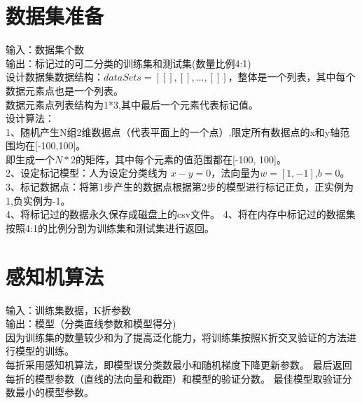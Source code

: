 \documentclass[UTF8,twoside,fontset=none,heading=true,scheme=chinese]{ctexart}
\begin{document}
    \section{数据集准备}
    \noindent 输入：数据集个数  \\
    输出：标记过的可二分类的训练集和测试集(数量比例4:1) \\
    设计数据集数据结构：$dataSets=[ [],[],...,[] ]$，整体是一个列表，其中每个数据元素点也是一个列表。 \\
    数据元素点列表结构为1*3,其中最后一个元素代表标记值。    \\
    设计算法：  \\
    1、随机产生N组2维数据点（代表平面上的一个点）,限定所有数据点的x和y轴范围均在[-100,100]。    \\
       即生成一个$N*2$的矩阵，其中每个元素的值范围都在[-100, 100]。    \\
    2、设定标记模型：人为设定分类线为 $x-y=0$，法向量为$w=[1, -1]$,$b=0$。   \\
    3、标记数据点：将第1步产生的数据点根据第2步的模型进行标记正负，正实例为1,负实例为-1。   \\
    4、将标记过的数据永久保存成磁盘上的csv文件。
    4、将在内存中标记过的数据集按照4:1的比例分割为训练集和测试集进行返回。

    \section{感知机算法}
    \noindent 输入：训练集数据，K折参数 \\ 输出：模型（分类直线参数和模型得分) \\
    因为训练集的数量较少和为了提高泛化能力，将训练集按照K折交叉验证的方法进行模型的训练。\\
    每折采用感知机算法，即模型误分类数最小和随机梯度下降更新参数。
    最后返回每折的模型参数（直线的法向量和截距）和模型的验证分数。
    最佳模型取验证分数最小的模型参数。
\end{document}
